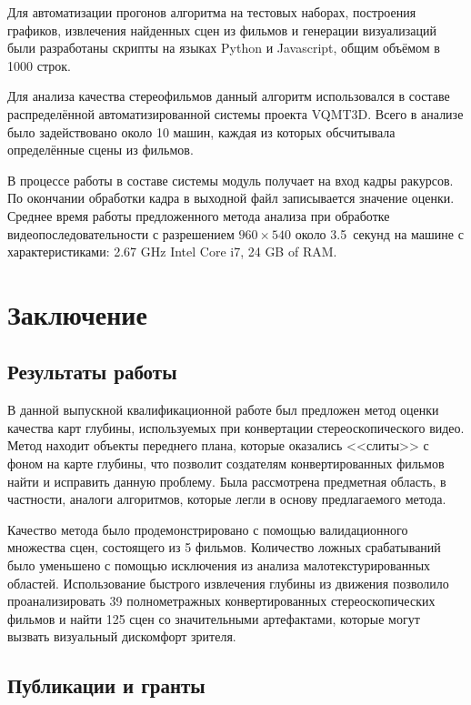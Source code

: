 \documentclass[14pt, a4paper]{extarticle}
\begin{document}
Для автоматизации прогонов алгоритма на тестовых наборах, построения графиков, 
извлечения найденных сцен из фильмов и генерации визуализаций были разработаны 
скрипты на языках Python и Javascript, общим объёмом в 1000 строк. 

Для анализа качества стереофильмов данный алгоритм использовался в составе 
распределённой автоматизированной системы проекта VQMT3D. Всего в анализе было 
задействовано около 10 машин, каждая из которых обсчитывала определённые сцены из фильмов.

В процессе работы в составе системы модуль получает на вход кадры ракурсов. 
По окончании обработки кадра в выходной файл записывается значение оценки. 
Среднее время работы предложенного метода анализа при обработке 
видеопоследовательности с разрешением $960\times540$ около 3.5~секунд
на машине с характеристиками: 2.67 GHz Intel Core i7, 24 GB of RAM. 



\newpage
\section{Заключение}

\subsection{Результаты работы}

В данной выпускной квалификационной работе был 
предложен метод оценки качества карт глубины,
используемых при конвертации стереоскопического видео. Метод находит объекты
переднего плана, которые оказались <<слиты>> с фоном на карте глубины,
что позволит создателям конвертированных фильмов найти и исправить данную проблему.
Была рассмотрена предметная область, в частности, аналоги алгоритмов, которые легли
в основу предлагаемого метода.

Качество метода было продемонстрировано с помощью валидационного множества сцен, 
состоящего из 5 фильмов. Количество ложных срабатываний было уменьшено
с помощью исключения из анализа малотекстурированных областей. Использование
быстрого извлечения глубины из движения позволило проанализировать 39
полнометражных конвертированных стереоскопических фильмов и найти
125 сцен со значительными артефактами, которые могут вызвать визуальный
дискомфорт зрителя.

\subsection{Публикации и гранты}
\end{document}
